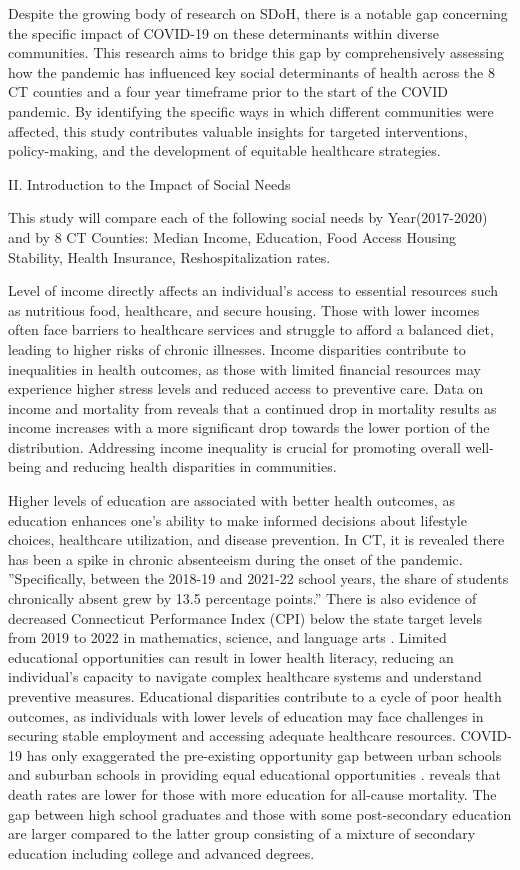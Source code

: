 \documentclass[12pt]{article}
\begin{document}
Despite the growing body of research on SDoH, there is a notable gap concerning the specific impact of COVID-19 on 
these determinants within diverse communities. This research aims to bridge this gap by comprehensively assessing how 
the pandemic has influenced key social determinants of health across the 8 CT counties and a four year timeframe prior to 
the start of the COVID pandemic. By identifying the specific ways in which different communities were affected, this study contributes valuable insights 
for targeted interventions, policy-making, and the development of equitable healthcare strategies.

II. Introduction to the Impact of Social Needs

This study will compare each of the following social needs by Year(2017-2020) and by 8 CT Counties: 
Median Income,
Education,
Food Access
Housing Stability,
Health Insurance,
Reshospitalization rates.

Level of income
directly affects an individual's access
to essential resources such as nutritious
food, healthcare, and secure housing.
Those with lower incomes often face
barriers to healthcare services and
struggle to afford a balanced diet,
leading to higher risks of chronic
illnesses. Income disparities contribute
to inequalities in health outcomes, as
those with limited financial resources
may experience higher stress levels and
reduced access to preventive care. 
Data on income and mortality from 
\citep{IOM2006}
reveals that a continued drop in mortality results as income increases with a 
more significant drop towards the lower portion of the distribution.
Addressing income inequality is crucial
for promoting overall well-being and
reducing health disparities in communities.

Higher levels
of education are associated with better
health outcomes, as education enhances
one's ability to make informed decisions
about lifestyle choices, healthcare
utilization, and disease prevention. In CT, it is revealed there has been a spike in chronic absenteeism during the onset of the pandemic.
 ''Specifically, between the 2018-19 and 2021-22 school years, the share of students chronically absent grew by 13.5 percentage points.''\citep{CTGov}
There is also evidence of decreased Connecticut Performance Index (CPI) below the state target levels from 2019 to 2022 in mathematics, science,
and language arts
\citep{CTGov}.
Limited educational opportunities can
result in lower health literacy, reducing
an individual's capacity to navigate
complex healthcare systems and understand
preventive measures. Educational
disparities contribute to a cycle of
poor health outcomes, as individuals
with lower levels of education may face
challenges in securing stable employment
and accessing adequate healthcare
resources. COVID-19 has only exaggerated
the pre-existing opportunity gap between urban schools and suburban schools in providing equal educational
opportunities 
\citep{MFoxCNBC_2020}.
\citep{NCHS2004} reveals that death rates are lower for those with more education for all-cause mortality. 
The gap between high school graduates and those with some post-secondary education are larger compared to the latter group consisting
of a mixture of secondary education including college and advanced degrees.
\end{document}
